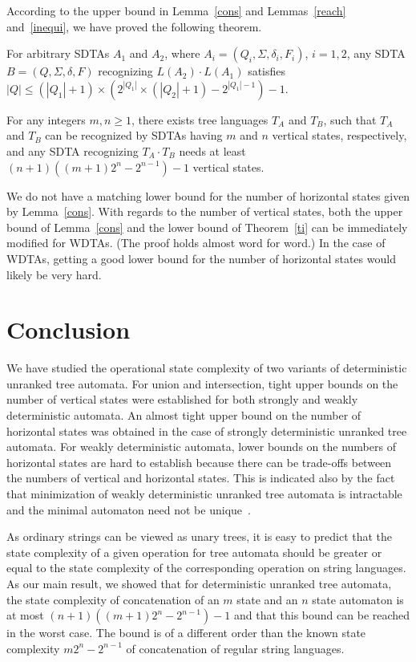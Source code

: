 \documentclass[copyright]{eptcs}
\begin{document}
According to the upper bound in Lemma~\ref{cons} and
Lemmas~\ref{reach} and~\ref{inequi}, we have proved the following
theorem.

\begin{theorem}\label{ti}
For arbitrary SDTAs $A_1$ and $A_2$, where
$A_i=(Q_i,\Sigma,\delta_i,F_i)$, $i=1,2$, any SDTA
$B=(Q,\Sigma,\delta,F)$ recognizing $L(A_2)\cdot L(A_1)$ satisfies
$|Q|\leq (|Q_1| + 1)\times (2^{|Q_1|} \times
(|Q_2|+1)-2^{|Q_1|-1})-1$.

For any integers $m,n\geq 1$, there exists tree languages $T_A$ and
$T_B$, such that $T_A$ and $T_B$ can be recognized by  SDTAs
having $m$ and $n$ vertical states, respectively,
 and any SDTA recognizing
$T_A \cdot T_B$ needs at least $(n+1) ( (m+1)2^n-2^{n-1} )-1$
vertical states.
\end{theorem}

We do not have a matching lower bound for the number of horizontal
states given by Lemma~\ref{cons}. With regards to the number of
vertical states, both the upper bound of Lemma~\ref{cons} and the
lower bound of Theorem~\ref{ti} can be immediately modified for
WDTAs. (The proof holds almost word for word.)  In the case of
WDTAs, getting a good lower bound for the number of horizontal
states would likely be very hard.

\section{Conclusion}

We have studied the operational state complexity of two variants
of deterministic unranked tree automata. For  union and
intersection, tight upper bounds on the number of vertical states
were established for both strongly and weakly deterministic
automata. An almost tight upper bound on the number of horizontal
states was obtained in the case of strongly deterministic unranked
tree automata. For weakly deterministic  automata,
lower bounds on the numbers of horizontal states are hard to
establish because there can be trade-offs between the numbers of
vertical and horizontal states.
This is indicated also by the fact that minimization of weakly
deterministic unranked tree automata is intractable and the
minimal automaton need not be unique~\cite{mn}.

As  ordinary
strings can be viewed as unary trees, it is easy to predict that
the state complexity of a given operation for tree automata should
be greater or equal to  the state complexity of the corresponding
operation on string languages.
As our main result, we showed that for
deterministic unranked tree automata, the
 state complexity of concatenation of an $m$ state and
an $n$ state automaton is at most $(n+1) ( (m+1)2^n-2^{n-1} )-1$
and that this bound can be reached in the worst case.
The bound is
of a different order than the known state complexity $m2^n-2^{n-1}$
of  concatenation of regular string languages.
\end{document}
